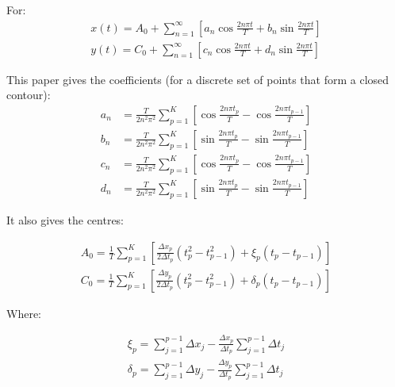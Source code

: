 \documentclass[12pt,english]{article}
\begin{document}
For:
\begin{equation}
\begin{aligned}
	x(t) = A_0+\sum_{n=1}^{\infty}\left[a_n\cos\frac{2n\pi t}{T}+b_n\sin\frac{2n\pi t}{T}\right] \\
	y(t) = C_0+\sum_{n=1}^{\infty}\left[c_n\cos\frac{2n\pi t}{T}+d_n\sin\frac{2n\pi t}{T}\right]
\end{aligned}
\end{equation}

\be

This paper gives the coefficients (for a discrete set of points that form a closed contour):
\begin{equation}
\begin{aligned}
	a_n&=\frac{T}{2n^2\pi^2}\sum_{p=1}^{K}\left[\cos\frac{2n\pi t_p}{T}-\cos\frac{2n\pi t_{p-1}}{T}\right] \\
	b_n&=\frac{T}{2n^2\pi^2}\sum_{p=1}^{K}\left[\sin\frac{2n\pi t_p}{T}-\sin\frac{2n\pi t_{p-1}}{T}\right] \\
	c_n&=\frac{T}{2n^2\pi^2}\sum_{p=1}^{K}\left[\cos\frac{2n\pi t_p}{T}-\cos\frac{2n\pi t_{p-1}}{T}\right] \\
	d_n&=\frac{T}{2n^2\pi^2}\sum_{p=1}^{K}\left[\sin\frac{2n\pi t_p}{T}-\sin\frac{2n\pi t_{p-1}}{T}\right]
\end{aligned}
\end{equation}

It also gives the centres:

\begin{equation}
\begin{aligned}
	A_0 = \frac{1}{T}\sum_{p=1}^{K}\left[\frac{\Delta x_p}{2\Delta t_p}\left(t_p^2-t_{p-1}^2\right)+\xi_p\left(t_p-t_{p-1}\right) \right]\\
	C_0 = \frac{1}{T}\sum_{p=1}^{K}\left[\frac{\Delta y_p}{2\Delta t_p}\left(t_p^2-t_{p-1}^2\right)+\delta_p\left(t_p-t_{p-1}\right) \right]
\end{aligned}
\end{equation}

Where:

\begin{equation}
\begin{aligned}
	\xi_p = \sum_{j=1}^{p-1}\Delta x_j-\frac{\Delta x_p}{\Delta t_p}\sum_{j=1}^{p-1}\Delta t_j \\
	\delta_p = \sum_{j=1}^{p-1}\Delta y_j-\frac{\Delta y_p}{\Delta t_p}\sum_{j=1}^{p-1}\Delta t_j
\end{aligned}
\end{equation}
\end{document}
